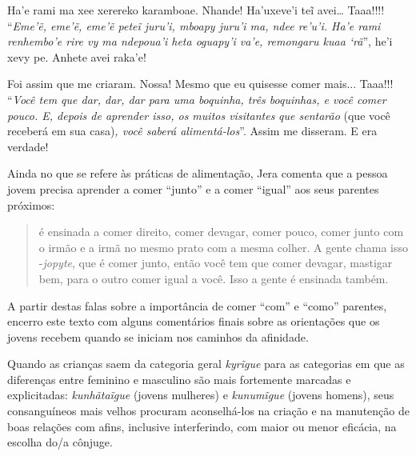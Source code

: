 \begin{paracol}{2}
\switchcolumn
Ha'e rami ma xee xerereko karamboae. Nhande! Ha'uxeve'i teĩ avei\ldots{}
Taaa!!!! ``\emph{Eme'ẽ, eme'ẽ, eme'ẽ peteĩ juru'i, mboapy juru'i ma,
ndee re'u'i. Ha'e rami renhembo'e rire vy ma ndepoua'i heta oguapy'i
va'e, remongaru kuaa `rã}'', he'i xevy pe. Anhete avei raka'e!

\switchcolumn
Foi assim que me criaram. Nossa! Mesmo que eu quisesse comer mais...
Taaa!!! ``\emph{Você tem que dar, dar, dar para uma boquinha, três
boquinhas, e você comer pouco. E, depois de aprender isso, os muitos
visitantes} \emph{que sentarão} (que você receberá em sua casa)\emph{,
você saberá alimentá-los}''. Assim me disseram. E era verdade!
\end{paracol}

\bigskip

Ainda no que se refere às práticas de alimentação, Jera comenta que a
pessoa jovem precisa aprender a comer ``junto'' e a comer ``igual'' aos seus
parentes próximos:

\begin{quotation}
 é ensinada a comer direito, comer devagar, comer pouco,
comer junto com o irmão e a irmã no mesmo prato com a mesma colher. A
gente chama isso -\emph{jopyte}, que é comer junto, então você tem que comer
devagar, mastigar bem, para o outro comer igual a você. Isso a gente é
ensinada também.
\end{quotation}

A partir destas falas sobre a importância de comer ``com'' e ``como'' parentes,
encerro este texto com alguns comentários finais sobre as orientações
que os jovens recebem quando se iniciam nos caminhos da afinidade.

Quando as crianças saem da categoria geral \emph{kyrĩgue} para as categorias
em que as diferenças entre feminino e masculino são mais fortemente
marcadas e explicitadas: \emph{kunhãtaĩgue} (jovens mulheres) e
\emph{kunumĩgue} (jovens homens), seus consanguíneos mais velhos procuram
aconselhá-los na criação e na manutenção de boas relações com afins,
inclusive interferindo, com maior ou menor eficácia, na escolha do/a
cônjuge.

